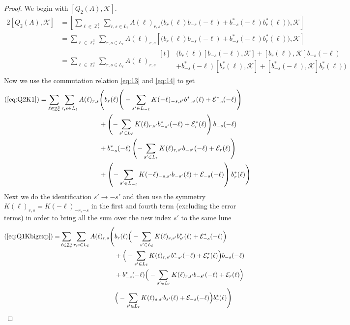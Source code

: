 \documentclass[sn-mathphys, Numbered ,a4paper]{sn-jnl}%
\DeclareMathOperator{\Z}{\mathbb{Z}}
\theoremstyle{plain}
\theoremstyle{definition}
\theoremstyle{remark}
\theoremstyle{plain}
\theoremstyle{definition}
\theoremstyle{remark}
\begin{document}
\begin{proof}
We begin with $[ Q_2(A),\mathcal{K}]$.
\begin{alignat}{2}
    [Q_2(A),\mathcal{K}] &= \left[\sum\limits_{\ell \in \Z^3_*}\sum\limits_{r,s \in L_{\ell}}A(\ell)_{r,s}\Big(b_{r}(\ell)b_{-s}(-\ell) + b^*_{-s}(-\ell)b^*_{r}(\ell)\Big),\mathcal{K}\right]\nonumber\\
    &= \sum\limits_{\ell \in \Z^3_*}\sum\limits_{r,s \in L_{\ell}}A(\ell)_{r,s}\left[\Big(b_{r}(\ell)b_{-s}(-\ell) + b^*_{-s}(-\ell)b^*_{r}(\ell)\Big),\mathcal{K}\right]\nonumber\\
    &= \sum\limits_{\ell \in \Z^3_*}\sum\limits_{r,s \in L_{\ell}}A(\ell)_{r,s}\begin{aligned}[t]
        &\Big(b_{r}(\ell)[b_{-s}(-\ell),\mathcal{K}] + [b_{r}(\ell),\mathcal{K}]b_{-s}(-\ell)\\&+ b^*_{-s}(-\ell)[b^*_{r}(\ell),\mathcal{K}] + [b^*_{-s}(-\ell),\mathcal{K}]b^*_{r}(\ell) \Big)
    \end{aligned}\label{eq:Q2K1}
\end{alignat}
Now we use the commutation relation \eqref{eq:13} and \eqref{eq:14} to get
\begin{equation}\label{eq:Q1Kbigexp}
    (\ref{eq:Q2K1})=\sum\limits_{\ell \in \Z^3_*}\sum\limits_{r,s \in L_{\ell}}A(\ell)_{r,s}\begin{aligned}[t]
        &\Bigg(b_{r}(\ell)\Bigg(-\sum\limits_{s'\in L_{-\ell}}K(-\ell)_{-s,s'}b^*_{-s'}(\ell) + \mathcal{E}^*_{-s}(-\ell)\Bigg)\\ &+ \left(-\sum\limits_{s'\in L_{\ell}}K(\ell)_{r,s'}b^*_{-s'}(-\ell) + \mathcal{E}^*_{r}(\ell)\right)b_{-s}(-\ell)\\&+ b^*_{-s}(-\ell)\left(-\sum\limits_{s'\in L_{\ell}}K(\ell)_{r,s'}b_{-s'}(-\ell) + \mathcal{E}_{r}(\ell)\right)\\ &+ \left(-\sum\limits_{s'\in L_{-\ell}}K(-\ell)_{-s,s'}b_{-s'}(\ell) + \mathcal{E}_{-s}(-\ell)\right)b^*_{r}(\ell) \Bigg)
    \end{aligned}
\end{equation}
Next we do the identification $s'\rightarrow -s'$ and then use the symmetry $K(\ell)_{r,s} = K(-\ell)_{-r,-s}$ in the first and fourth term (excluding the error terms) in order to bring all the sum over the new index $s'$ to the same lune
\begin{alignat}{2}
    (\ref{eq:Q1Kbigexp})=&\sum\limits_{\ell \in \Z^3_*}\sum\limits_{r,s \in L_{\ell}}A(\ell)_{r,s}\begin{aligned}[t]
        \Bigg(&b_{r}(\ell)\Big(-\sum\limits_{s'\in L_{\ell}}K(\ell)_{s,s'}b^*_{s'}(\ell) + \mathcal{E}^*_{-s}(-\ell)\Big)\\ &+ \Big(-\sum\limits_{s'\in L_{\ell}}K(\ell)_{r,s'}b^*_{-s'}(-\ell) + \mathcal{E}^*_{r}(\ell)\Big)b_{-s}(-\ell)\\&+ b^*_{-s}(-\ell)\Big(-\sum\limits_{s'\in L_{\ell}}K(\ell)_{r,s'}b_{-s'}(-\ell) + \mathcal{E}_{r}(\ell)\Big)\\ & \Big(-\sum\limits_{s'\in L_{\ell}}K(\ell)_{s,s'}b_{s'}(\ell) + \mathcal{E}_{-s}(-\ell)\Big)b^*_{r}(\ell) \Bigg)

\end{aligned}
\end{alignat}
\end{proof}
\end{document}
